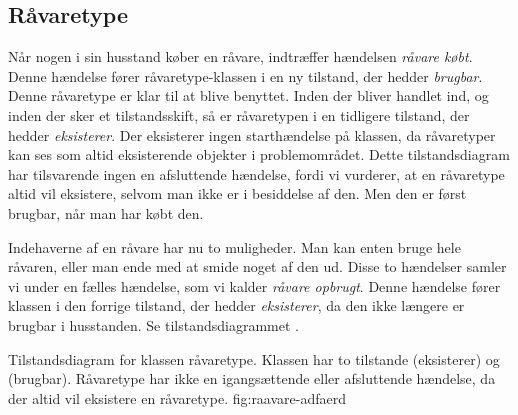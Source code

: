 \subsection{Råvaretype}
Når nogen i sin husstand køber en råvare, indtræffer hændelsen \textit{råvare købt}. Denne hændelse fører råvaretype-klassen i en ny tilstand, der hedder \textit{brugbar}. Denne råvaretype er klar til at blive benyttet. Inden der bliver handlet ind, og inden der sker et tilstandsskift, så er råvaretypen i en tidligere tilstand, der hedder \textit{eksisterer}. Der eksisterer ingen starthændelse på klassen, da råvaretyper kan ses som altid eksisterende objekter i problemområdet. Dette tilstandsdiagram har tilsvarende ingen en afsluttende hændelse, fordi vi vurderer, at en råvaretype altid vil eksistere, selvom man ikke er i besiddelse af den. Men den er først brugbar, når man har købt den. 

Indehaverne af en råvare har nu to muligheder. Man kan enten bruge hele råvaren, eller man ende med at smide noget af den ud. Disse to hændelser samler vi  under en fælles hændelse, som vi kalder \textit{råvare opbrugt}. Denne hændelse fører klassen i den forrige tilstand, der hedder \textit{eksisterer}, da den ikke længere er brugbar i husstanden. Se tilstandsdiagrammet .

  {Tilstandsdiagram for klassen råvaretype. Klassen har to tilstande (eksisterer) og (brugbar). Råvaretype har ikke en igangsættende eller afsluttende hændelse, da der altid vil eksistere en råvaretype.}
  {fig:raavare-adfaerd}
